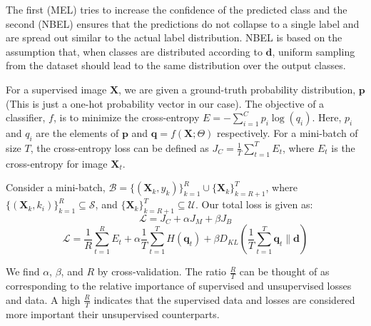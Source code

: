 The first (MEL) tries to increase the confidence of the predicted class and the second (NBEL)
ensures that the predictions do not collapse to a single label and are spread out similar to
the actual label distribution. NBEL is based on the assumption that, when classes are distributed
according to $\mathbf{d}$, uniform sampling from the dataset should lead to the same distribution
over the output classes.

For a supervised image $\mathbf X$, we are given a ground-truth probability distribution, $\mathbf{p}$ (This is
just a one-hot probability vector in our case). The objective of a classifier, $f$, is to minimize the
cross-entropy $E = -\sum_{i=1}^{C}p_i \log(q_i)$. Here, $p_i$ and $q_i$
are the elements of $\mathbf{p}$ and $\mathbf{q} = f(\mathbf{X}; \Theta)$ respectively. For a
mini-batch of size $T$, the cross-entropy loss can be defined as $J_C = \frac{1}{T} \sum_{t=1}^{T}
E_t$, where $E_t$ is the cross-entropy for image $\mathbf{X}_t$.

Consider a mini-batch, $\mathcal{B} =
\{(\mathbf{X}_k, y_k)\}_{k=1}^R \cup \{\mathbf{X}_k\}_{k=R+1}^T$, where $\{(\mathbf{X}_k,
k_i)\}_{k=1}^{R} \subseteq \mathcal{S}$, and $\{\mathbf{X}_k\}_{k=R+1}^{T} \subseteq \mathcal{U}$. Our total loss
is given as:
\begin{equation}
	\mathcal{L} = J_C + \alpha J_M + \beta J_B
\end{equation}
\begin{equation}
	\mathcal{L} = \frac{1}{R} \sum_{t=1}^{R} E_t + \alpha \frac{1}{T}\sum_{t=1}^{T}H(\mathbf{q}_t) +
	\beta D_{KL}(\frac{1}{T}\sum_{t=1}^{T}\mathbf{q}_t \lVert \mathbf{d})
\end{equation}


We find $\alpha$, $\beta$, and $R$ by cross-validation. The ratio $\frac{R}{T}$ can be thought of as
corresponding to the relative importance of supervised and unsupervised losses and data. A high
$\frac{R}{T}$ indicates that the supervised data and losses are considered more important their
unsupervised counterparts. 


